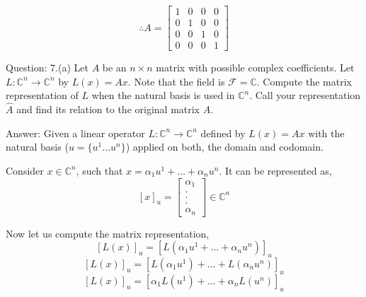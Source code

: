 \documentclass[a4paper]{article}
\begin{document}
\begin{qalist}
		\begin{equation}\label{q6bfinalAns}
			\therefore A = 
				\begin{bmatrix} 
					1 & 0 & 0 & 0 \\
					0 & 1 & 0 & 0 \\
					0 & 0 & 1 & 0 \\
					0 & 0 & 0 & 1
				\end{bmatrix}
		\end{equation}		

		\item[Question: 7.(a)] \setcounter{equation}{0} Let $A$ be an $n\times n$ matrix with possible complex coefficients. Let $L  : {\mathbb{C}}^{n} \rightarrow {\mathbb{C}}^{n}$ by $L(x) = Ax$. Note that the field is $\mathcal{F} = \mathbb{C}$. Compute the matrix representation of $L$ when the natural basis is used in ${\mathbb{C}}^{n}$. Call your representation $\hat{A}$ and find its relation to the original matrix $A$.
		\item[Answer:] Given a linear operator $L  : {\mathbb{C}}^{n} \rightarrow {\mathbb{C}}^{n}$ defined by $L(x) = Ax$ with the natural basis ($u = \{{u}^{1} \ldots {u}^{n}\}$) applied on both, the domain and codomain.
		
			Consider $x \in {\mathbb{C}}^{n}$, such that $x = {\alpha}_{1}{u}^{1} + \ldots + {\alpha}_{n}{u}^{n}$. It can be represented as,
			\begin{equation}
				{[x]}_{u} = \begin{bmatrix} {\alpha}_{1} \\ .\\ .\\ . \\ {\alpha}_{n}\end{bmatrix} \in {\mathbb{C}}^{n}
			\end{equation}
			
			Now let us compute the matrix representation, 
			\begin{equation}
				{[L(x)]}_{u} = {[L( {\alpha}_{1}{u}^{1} + \ldots + {\alpha}_{n}{u}^{n})]}_{u}
			\end{equation}
			\begin{equation}
				{[L(x)]}_{u} = {[L({\alpha}_{1}{u}^{1}) + \ldots + L({\alpha}_{n}{u}^{n})]}_{u}
			\end{equation}
			\begin{equation}
				{[L(x)]}_{u} = {[{\alpha}_{1}L({u}^{1}) + \ldots + {\alpha}_{n}L({u}^{n})]}_{u}
			\end{equation}
			

\end{qalist}
\end{document}
